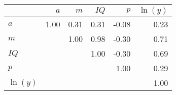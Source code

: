 \begin{tabular}{lrrrrr}
\hline
 & $a$  & $m$  & $IQ$  & $p$  & $\ln(y)$  \\
\hline
$a$ & 1.00  & 0.31  & 0.31  & -0.08  & 0.23  \\
$m$ &   & 1.00  & 0.98  & -0.30  & 0.71  \\
$IQ$ &   &   & 1.00  & -0.30  & 0.69  \\
$p$ &   &   &   & 1.00  & 0.29  \\
$\ln(y)$ &   &   &   &   & 1.00  \\
\hline
\end{tabular}%
